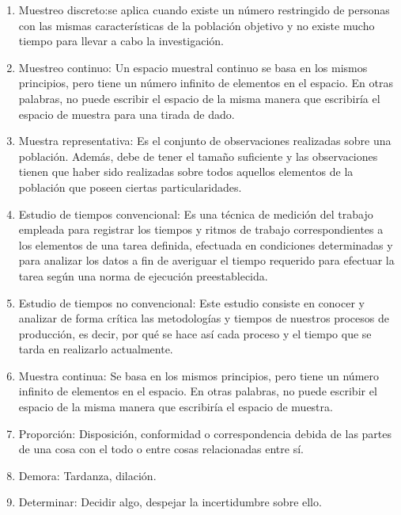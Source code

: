 \begin{enumerate}
    \cite{book}
    \item Muestreo discreto:se aplica cuando existe un número restringido de personas con las mismas características de la población objetivo y no existe mucho tiempo para llevar a cabo la investigación.
    \cite{book}
    \item Muestreo continuo: Un espacio muestral continuo se basa en los mismos principios, pero tiene un número infinito de elementos en el espacio. En otras palabras, no puede escribir el espacio de la misma manera que escribiría el espacio de muestra para una tirada de dado.
    \cite{book}
    \item Muestra representativa: Es el conjunto de observaciones realizadas sobre una población. Además, debe de tener el tamaño suficiente y las observaciones tienen que haber sido realizadas sobre todos aquellos elementos de la población que poseen ciertas particularidades.
    \cite{RAE}
    \item Estudio de tiempos convencional: Es una técnica de medición del trabajo empleada para registrar los tiempos y ritmos de trabajo correspondientes a los elementos de una tarea definida, efectuada en condiciones determinadas y para analizar los datos a fin de averiguar el tiempo requerido para efectuar la tarea según una norma de ejecución preestablecida.
    \cite{book}
    \item Estudio de tiempos no convencional: Este estudio consiste en conocer y analizar de forma crítica las metodologías y tiempos de nuestros procesos de producción, es decir, por qué se hace así cada proceso y el tiempo que se tarda en realizarlo actualmente.
    \cite{book}
    \item Muestra continua: Se basa en los mismos principios, pero tiene un número infinito de elementos en el espacio. En otras palabras, no puede escribir el espacio de la misma manera que escribiría el espacio de muestra.
    \cite{book}
    \item Proporción: Disposición, conformidad o correspondencia debida de las partes de una cosa con el todo o entre cosas relacionadas entre sí.
    \cite{book}
    \item  Demora: Tardanza, dilación.
    \cite{RAE}
    \item Determinar: Decidir algo, despejar la incertidumbre sobre ello.
    \cite{RAE}
    \end{enumerate}

